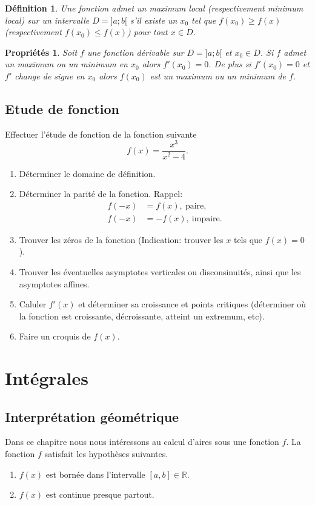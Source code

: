 \documentclass[a4paper,12pt]{book}
\newcommand{\real}{\mathbb{R}}
\newtheorem{definition}{Définition}
\newtheorem{proprietes}{Propriétés}
\begin{document}
\begin{definition} 
Une fonction admet un maximum local (respectivement minimum local) 
sur un intervalle $D=]a;b[$ s'il existe un $x_0$ tel que $f(x_0)\geq f(x)$ (respectivement $f(x_0)\leq f(x)$) pour tout $x\in D$. 
\end{definition}

\begin{proprietes}
Soit $f$ une fonction dérivable sur $D=]a;b[$ et $x_0\in D$. Si $f$ admet
un maximum ou un minimum en $x_0$ alors $f'(x_0)=0$. De plus si 
$f'(x_0)=0$ et $f'$ change de signe en $x_0$ alors $f(x_0)$ est un maximum ou un minimum de $f$.
\end{proprietes}

\section{Etude de fonction}

Effectuer l'étude de fonction de la fonction suivante 
\begin{equation}
 f(x)=\frac{x^3}{x^2-4}.
\end{equation}
\begin{enumerate}
 \item Déterminer le domaine de définition.
 \item Déterminer la parité de la fonction. Rappel:
 \begin{align}
  f(-x)&=f(x),\ \mbox{paire},\\
  f(-x)&=-f(x),\ \mbox{impaire}.
 \end{align}
 \item Trouver les zéros de la fonction (Indication: trouver les $x$ tels que $f(x)=0$).
 \item Trouver les éventuelles asymptotes verticales ou disconsinuités, ainsi que les asymptotes affines.
 \item Caluler $f'(x)$ et déterminer sa croissance et points critiques (déterminer où la fonction est croissante, décroissante, atteint un extremum, etc).
 \item Faire un croquis de $f(x)$.
\end{enumerate}



\chapter{Intégrales}

\section{Interprétation géométrique}
Dans ce chapitre nous nous intéressons au calcul d'aires sous une fonction $f$.
La fonction $f$ satisfait les hypothèses suivantes. 
\begin{enumerate}
\item $f(x)$ est bornée dans l'intervalle $[a,b]\in\real$. 
\item $f(x)$ est continue presque partout.
\end{enumerate}
\end{document}
